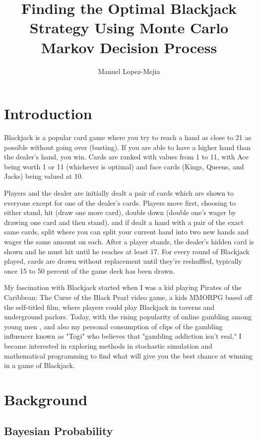 \documentclass[12pt,a4paper]{cibb}
\title{\Large $\ $\\ \bf Finding the Optimal Blackjack Strategy Using Monte Carlo Markov Decision Process}
\author{\large Manuel Lopez-Mejia}
\begin{document}
\thispagestyle{myheadings}
\pagestyle{myheadings}

\section{Introduction}
\label{sec:SCIENTIFIC-BACKGROUND}

Blackjack is a popular card game where you try to reach a hand as close to 21 as possible without going over (busting). If you are able to have a higher hand than the dealer's hand, you win. Cards are ranked with values from 1 to 11, with Ace being worth 1 or 11 (whichever is optimal) and face cards (Kings, Queens, and Jacks) being valued at 10.

Players and the dealer are initially dealt a pair of cards which are shown to everyone except for one of the dealer's cards. Players move first, choosing to either stand, hit (draw one more card), double down (double one's wager by drawing one card and then stand), and if dealt a hand with a pair of the exact same cards, split where you can split your current hand into two new hands and wager the same amount on each. After a player stands, the dealer's hidden card is shown and he must hit until he reaches at least 17. For every round of Blackjack played, cards are drawn without replacement until they're reshuffled, typically once 15 to 50 percent of the game deck has been drawn.

My fascination with Blackjack started when I was a kid playing Pirates of the Caribbean: The Curse of the Black Pearl video game, a kids MMORPG based off the self-titled film, where players could play Blackjack in taverns and underground parlors. Today, with the rising popularity of online gambling among young men \cite{source}, and also my personal consumption of clips of the gambling influencer known as "Togi" who believes that "gambling addiction isn't real," I became interested in exploring methods in stochastic simulation and mathematical programming to find what will give you the best chance at winning in a game of Blackjack.

\section{Background}
\label{sec:Theory}

\subsection{Bayesian Probability}
\end{document}

